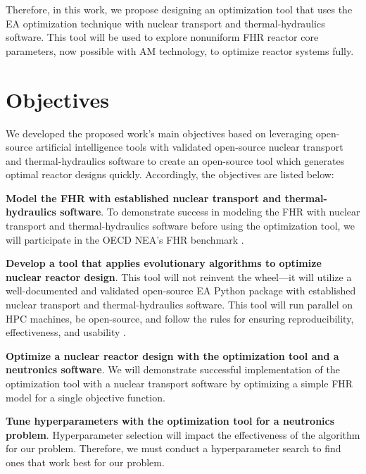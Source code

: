 Therefore, in this work, we propose designing an optimization tool that uses 
the \gls{EA} optimization technique with nuclear transport and 
thermal-hydraulics software. 
This tool will be used to explore nonuniform FHR reactor core parameters, now 
possible with \gls{AM} technology, to optimize reactor systems 
fully. 

\section{Objectives}
We developed the proposed work's main objectives based on leveraging 
open-source artificial intelligence tools with validated open-source nuclear 
transport and thermal-hydraulics software to create an open-source tool which 
generates optimal reactor designs quickly. 
Accordingly, the objectives are listed below:

\vspace{0.2cm} 
\noindent
\textbf{Model the \gls{FHR} with established 
nuclear transport and thermal-hydraulics software}.
To demonstrate success in modeling the \gls{FHR} with nuclear transport and 
thermal-hydraulics software before using the optimization tool, we will 
participate in the \gls{OECD} \gls{NEA}'s \gls{FHR} benchmark 
\cite{noauthor_fluoride_nodate}. 

\vspace{0.2cm} 
\noindent
\textbf{Develop a tool that applies evolutionary algorithms to optimize nuclear 
reactor design}. 
This tool will not reinvent the wheel---it will utilize a well-documented 
and validated open-source \gls{EA} Python package with established 
nuclear transport and thermal-hydraulics software. This tool will run parallel on 
\gls{HPC} machines, be open-source, and follow the rules for ensuring 
reproducibility, effectiveness, and usability 
\cite{list_ten_2017,osborne_ten_2014,sandve_ten_2013}. 

\vspace{0.2cm} 
\noindent
\textbf{Optimize a nuclear reactor design with the optimization tool and a 
neutronics software}. 
We will demonstrate successful implementation of the optimization tool with a
nuclear transport software by optimizing a simple \gls{FHR} model for a single 
objective function. 

\vspace{0.2cm} 
\noindent
\textbf{Tune hyperparameters with the optimization tool for a neutronics problem}.
Hyperparameter selection will impact the effectiveness of the algorithm 
for our problem. 
Therefore, we must conduct a hyperparameter search to find ones that work best 
for our problem. 

